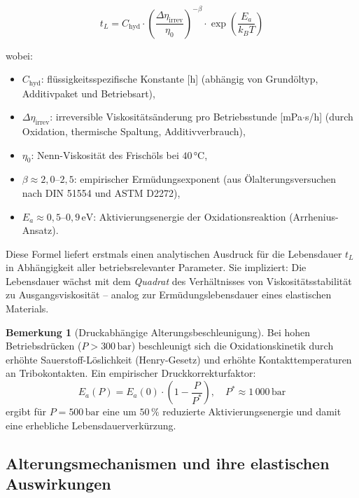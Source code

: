 ﻿\documentclass[a4paper,12pt]{scrreprt}
\theoremstyle{definition}
\newtheorem{bemerkung}{Bemerkung}[section]
\begin{document}
\begin{equation}
  \boxed{
    t_L = C_{\mathrm{hyd}} \cdot
      \left(\frac{\Delta\eta_{\mathrm{irrev}}}{\eta_0}\right)^{-\beta}
      \cdot \exp\!\left(\frac{E_a}{k_B T}\right)
  }
  \label{eq:lebensdauer_hydrauliköl}
\end{equation}

wobei:
\begin{itemize}
  \item $C_{\mathrm{hyd}}$: flüssigkeitsspezifische Konstante [h]
    (abhängig von Grundöltyp, Additivpaket und Betriebsart),
  \item $\Delta\eta_{\mathrm{irrev}}$: irreversible Viskositätsänderung
    pro Betriebsstunde [mPa$\cdot$s/h] (durch Oxidation, thermische Spaltung,
    Additivverbrauch),
  \item $\eta_0$: Nenn-Viskosität des Frischöls bei $40\, °\mathrm{C}$,
  \item $\beta \approx 2{,}0$--$2{,}5$: empirischer Ermüdungsexponent
    (aus Ölalterungsversuchen nach DIN 51554 und ASTM D2272),
  \item $E_a \approx 0{,}5$--$0{,}9\,\mathrm{eV}$: Aktivierungsenergie
    der Oxidationsreaktion (Arrhenius-Ansatz).
\end{itemize}

Diese Formel liefert erstmals einen analytischen Ausdruck für die
Lebensdauer $t_L$ in Abhängigkeit aller betriebsrelevanter Parameter.
Sie impliziert: Die Lebensdauer wächst mit dem \emph{Quadrat} des
Verhältnisses von Viskositätsstabilität zu Ausgangsviskosität --
analog zur Ermüdungslebensdauer eines elastischen Materials.

\begin{bemerkung}[Druckabhängige Alterungsbeschleunigung]
  Bei hohen Betriebsdrücken ($P > 300\,\mathrm{bar}$) beschleunigt sich
  die Oxidationskinetik durch erhöhte Sauerstoff-Löslichkeit (Henry-Gesetz)
  und erhöhte Kontakttemperaturen an Tribokontakten. Ein empirischer
  Druckkorrekturfaktor:
  \begin{equation}
    E_a(P) = E_a(0) \cdot \left(1 - \frac{P}{P^*}\right),
    \quad P^* \approx 1\,000\,\mathrm{bar}
    \label{eq:ea_druckkorrektur}
  \end{equation}
  ergibt für $P = 500\,\mathrm{bar}$ eine um $50\,\%$ reduzierte
  Aktivierungsenergie und damit eine erhebliche Lebensdauerverkürzung.
\end{bemerkung}

\subsection{Alterungsmechanismen und ihre elastischen Auswirkungen}
\end{document}
